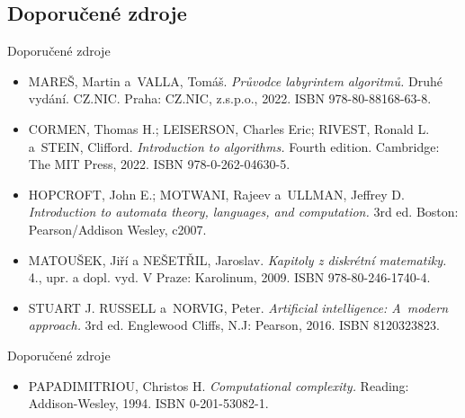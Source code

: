 \documentclass[11pt,professionalfont,aspectratio=1610 169] {beamer}
\begin{document}
    \subsection{Doporučené zdroje}

    \begin{frame}{Doporučené zdroje}
        \begin{itemize}
            \item MAREŠ, Martin a~VALLA, Tomáš. \textit{Průvodce labyrintem algoritmů.} Druhé vydání. CZ.NIC. Praha: CZ.NIC, z.s.p.o., 2022. ISBN 978-80-88168-63-8.
            \item CORMEN, Thomas H.; LEISERSON, Charles Eric; RIVEST, Ronald L. a~STEIN, Clifford. \textit{Introduction to algorithms.} Fourth edition. Cambridge: The MIT Press, 2022. ISBN 978-0-262-04630-5.
            \item HOPCROFT, John E.; MOTWANI, Rajeev a~ULLMAN, Jeffrey D. \textit{Introduction to automata theory, languages, and computation.} 3rd ed. Boston: Pearson/Addison Wesley, c2007.
            \item MATOUŠEK, Jiří a NEŠETŘIL, Jaroslav. \textit{Kapitoly z diskrétní matematiky.} 4., upr. a dopl. vyd. V Praze: Karolinum, 2009. ISBN 978-80-246-1740-4.
            \item STUART J. RUSSELL a~NORVIG, Peter. \textit{Artificial intelligence: A~modern approach.} 3rd ed. Englewood Cliffs, N.J: Pearson, 2016. ISBN 8120323823.
        \end{itemize}
    \end{frame}

    \begin{frame}{Doporučené zdroje}
        \begin{itemize}
            \item PAPADIMITRIOU, Christos H. \textit{Computational complexity.} Reading: Addison-Wesley, 1994. ISBN 0-201-53082-1.
        \end{itemize}
    \end{frame}
\end{document}
